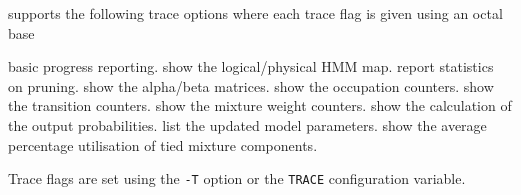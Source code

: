 
 supports the following trace options where each
trace flag is given using an octal base
\begin{optlist}
    basic progress reporting.
    show the logical/physical HMM map.
    report statistics on pruning.
    show the alpha/beta matrices.
    show the occupation counters.
    show the transition counters.
    show the mixture weight counters.
    show the calculation of the output probabilities.
    list the updated model parameters.
    show the average percentage utilisation
           of tied mixture components.
\end{optlist}
Trace flags are set using the \texttt{-T} option or the  \texttt{TRACE} 
configuration variable.


